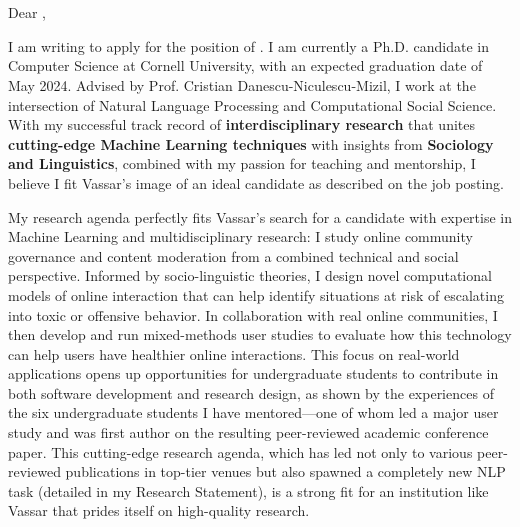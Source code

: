 \documentclass[12pt]{letter}
\begin{document}
\signature{Jonathan P. Chang}
\begin{letter}{
\department \\
\schoolnamelong \\
\schooladdress
}

\opening{
    Dear ,
}

I am writing to apply for the position of \position.
I am currently a Ph.D. candidate in Computer Science at Cornell University, with an expected graduation date of May 2024.
Advised by Prof. Cristian Danescu-Niculescu-Mizil, I work at the intersection of Natural Language Processing and Computational Social Science.
With my successful track record of \textbf{interdisciplinary research} that unites \textbf{cutting-edge Machine Learning techniques} with insights from \textbf{Sociology and Linguistics}, combined with my passion for teaching and mentorship, I believe I fit Vassar's image of an ideal candidate as described on the job posting.

My research agenda perfectly fits Vassar's search for a candidate with expertise in Machine Learning and multidisciplinary research: I study online community governance and content moderation from a combined technical and social perspective.
Informed by socio-linguistic theories, I design novel computational models of online interaction that can help identify situations at risk of escalating into toxic or offensive behavior.
In collaboration with real online communities, I then develop and run mixed-methods user studies to evaluate how this technology can help users have healthier online interactions.
This focus on real-world applications opens up opportunities for undergraduate students to contribute in both software development and research design, as shown by the experiences of the six undergraduate students I have mentored---one of whom led a major user study and was first author on the resulting peer-reviewed academic conference paper.
This cutting-edge research agenda, which has led not only to various peer-reviewed publications in top-tier venues but also spawned a completely new NLP task (detailed in my Research Statement), is a strong fit for an institution like Vassar that prides itself on high-quality research.


\end{letter}
\end{document}
